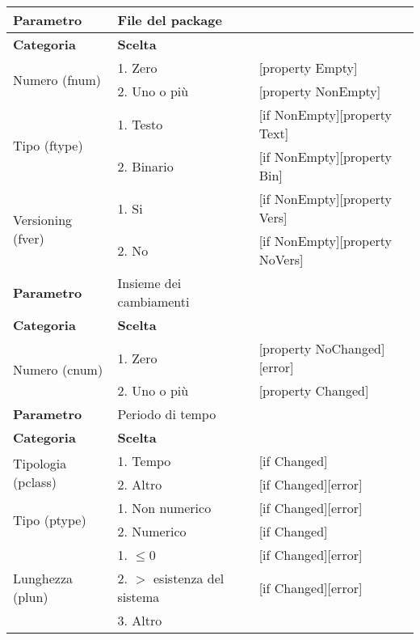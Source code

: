 \begin{tabular}{|p{4cm}|p{4cm}p{5cm}|}
	\hline
	\cellcolor{Gray} \textbf{Parametro}		& File del package	&											\tabularnewline
	\hline
	\rowcolor{Gray}
	\textbf{Categoria} 						& \textbf{Scelta}			&									\tabularnewline
	\hline
	\multirow{2}{*}{Numero (fnum)} 			& 1. Zero 					&	[property Empty] 				\tabularnewline
	\cline{2-3}
											& 2. Uno o più				&	[property NonEmpty]				\tabularnewline
	\hline
	\multirow{2}{*}{Tipo (ftype)} 			& 1. Testo					&	[if NonEmpty][property Text] 	\tabularnewline
	\cline{2-3}
											& 2. Binario				&	[if NonEmpty][property Bin]		\tabularnewline
	\hline
	\multirow{2}{*}{Versioning (fver)}		& 1. Si						&	[if NonEmpty][property Vers]	\tabularnewline
	\cline{2-3}
											& 2. No						&	[if NonEmpty][property NoVers]	\tabularnewline
	\hline
	
	
	\cellcolor{Gray} \textbf{Parametro}		& Insieme dei cambiamenti	&									\tabularnewline
	\hline
	\rowcolor{Gray}
	\textbf{Categoria} 						& \textbf{Scelta}			&									\tabularnewline
	\hline
	\multirow{2}{*}{Numero (cnum)} 			& 1. Zero 					&	[property NoChanged][error]			\tabularnewline
	\cline{2-3}
											& 2. Uno o più				&	[property Changed]				\tabularnewline
	\hline	
	
	
	\cellcolor{Gray} \textbf{Parametro}		& Periodo di tempo			&									\tabularnewline
	\hline
	\rowcolor{Gray}
	\textbf{Categoria} 						& \textbf{Scelta}			&									\tabularnewline
	\hline
	\multirow{2}{*}{Tipologia (pclass)} 	& 1. Tempo 					&	[if Changed]				 	\tabularnewline
						\cline{2-3}
						& 2. Altro 					&	[if Changed][error]							\tabularnewline
	\hline
	\multirow{2}{*}{Tipo (ptype)} 			& 1. Non numerico 			&	[if Changed][error]		 	\tabularnewline
	\cline{2-3}
											& 2. Numerico 				&	[if Changed]					\tabularnewline
	\hline
	\multirow{3}{*}{Lunghezza (plun)} 		& 1. $\leq 0$					&	[if Changed][error] 		\tabularnewline
	\cline{2-3}
											& 2. $>$ esistenza del sistema 	& 	[if Changed][error]			\tabularnewline
	\cline{2-3}
											& 3. Altro						&			\tabularnewline
	\hline
\end{tabular}

\vspace{1cm}


